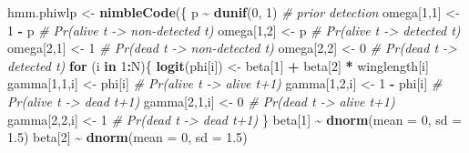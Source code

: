 \documentclass[
  12pt,
]{krantz}
\newenvironment{Shaded}{\begin{snugshade}}{\end{snugshade}}
\newcommand{\AttributeTok}[1]{\textcolor[rgb]{0.13,0.29,0.53}{#1}}
\newcommand{\CommentTok}[1]{\textcolor[rgb]{0.56,0.35,0.01}{\textit{#1}}}
\newcommand{\ControlFlowTok}[1]{\textcolor[rgb]{0.13,0.29,0.53}{\textbf{#1}}}
\newcommand{\DecValTok}[1]{\textcolor[rgb]{0.00,0.00,0.81}{#1}}
\newcommand{\FloatTok}[1]{\textcolor[rgb]{0.00,0.00,0.81}{#1}}
\newcommand{\FunctionTok}[1]{\textcolor[rgb]{0.13,0.29,0.53}{\textbf{#1}}}
\newcommand{\NormalTok}[1]{#1}
\newcommand{\OtherTok}[1]{\textcolor[rgb]{0.56,0.35,0.01}{#1}}
\newcommand{\SpecialCharTok}[1]{\textcolor[rgb]{0.81,0.36,0.00}{\textbf{#1}}}
\begin{document}
\begin{Shaded}
\begin{Highlighting}[]
\NormalTok{hmm.phiwlp }\OtherTok{\textless{}{-}} \FunctionTok{nimbleCode}\NormalTok{(\{}
\NormalTok{    p }\SpecialCharTok{\textasciitilde{}} \FunctionTok{dunif}\NormalTok{(}\DecValTok{0}\NormalTok{, }\DecValTok{1}\NormalTok{)             }\CommentTok{\# prior detection}
\NormalTok{    omega[}\DecValTok{1}\NormalTok{,}\DecValTok{1}\NormalTok{] }\OtherTok{\textless{}{-}} \DecValTok{1} \SpecialCharTok{{-}}\NormalTok{ p         }\CommentTok{\# Pr(alive t {-}\textgreater{} non{-}detected t)}
\NormalTok{    omega[}\DecValTok{1}\NormalTok{,}\DecValTok{2}\NormalTok{] }\OtherTok{\textless{}{-}}\NormalTok{ p             }\CommentTok{\# Pr(alive t {-}\textgreater{} detected t)}
\NormalTok{    omega[}\DecValTok{2}\NormalTok{,}\DecValTok{1}\NormalTok{] }\OtherTok{\textless{}{-}} \DecValTok{1}             \CommentTok{\# Pr(dead t {-}\textgreater{} non{-}detected t)}
\NormalTok{    omega[}\DecValTok{2}\NormalTok{,}\DecValTok{2}\NormalTok{] }\OtherTok{\textless{}{-}} \DecValTok{0}             \CommentTok{\# Pr(dead t {-}\textgreater{} detected t)}
  \ControlFlowTok{for}\NormalTok{ (i }\ControlFlowTok{in} \DecValTok{1}\SpecialCharTok{:}\NormalTok{N)\{}
    \FunctionTok{logit}\NormalTok{(phi[i]) }\OtherTok{\textless{}{-}}\NormalTok{ beta[}\DecValTok{1}\NormalTok{] }\SpecialCharTok{+}\NormalTok{ beta[}\DecValTok{2}\NormalTok{] }\SpecialCharTok{*}\NormalTok{ winglength[i]}
\NormalTok{    gamma[}\DecValTok{1}\NormalTok{,}\DecValTok{1}\NormalTok{,i] }\OtherTok{\textless{}{-}}\NormalTok{ phi[i]      }\CommentTok{\# Pr(alive t {-}\textgreater{} alive t+1)}
\NormalTok{    gamma[}\DecValTok{1}\NormalTok{,}\DecValTok{2}\NormalTok{,i] }\OtherTok{\textless{}{-}} \DecValTok{1} \SpecialCharTok{{-}}\NormalTok{ phi[i]  }\CommentTok{\# Pr(alive t {-}\textgreater{} dead t+1)}
\NormalTok{    gamma[}\DecValTok{2}\NormalTok{,}\DecValTok{1}\NormalTok{,i] }\OtherTok{\textless{}{-}} \DecValTok{0}           \CommentTok{\# Pr(dead t {-}\textgreater{} alive t+1)}
\NormalTok{    gamma[}\DecValTok{2}\NormalTok{,}\DecValTok{2}\NormalTok{,i] }\OtherTok{\textless{}{-}} \DecValTok{1}           \CommentTok{\# Pr(dead t {-}\textgreater{} dead t+1)}
\NormalTok{  \}}
\NormalTok{  beta[}\DecValTok{1}\NormalTok{] }\SpecialCharTok{\textasciitilde{}} \FunctionTok{dnorm}\NormalTok{(}\AttributeTok{mean =} \DecValTok{0}\NormalTok{, }\AttributeTok{sd =} \FloatTok{1.5}\NormalTok{)}
\NormalTok{  beta[}\DecValTok{2}\NormalTok{] }\SpecialCharTok{\textasciitilde{}} \FunctionTok{dnorm}\NormalTok{(}\AttributeTok{mean =} \DecValTok{0}\NormalTok{, }\AttributeTok{sd =} \FloatTok{1.5}\NormalTok{)}

\end{Highlighting}
\end{Shaded}
\end{document}
